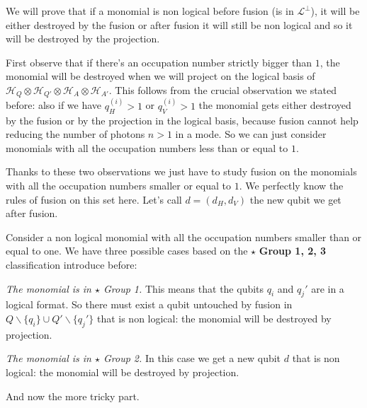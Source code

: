 \documentclass{article}
\begin{document}
We will prove that if a monomial is non logical before fusion (is in $\mathcal{L}^{\perp}$), it will be either destroyed by the fusion or after fusion it will still be non logical and so it will be destroyed by the projection.

First observe that if there's an occupation number strictly bigger than $1$, the monomial will be destroyed when we will project on the logical basis of $\mathcal{H}_{Q} \otimes\mathcal{H}_{Q'} \otimes\mathcal{H}_A \otimes\mathcal{H}_{A'}$. This follows from the crucial observation we stated before: also if we have $q^{(i)}_H > 1$  or $q^{(i)}_V > 1$ the monomial gets either destroyed by the fusion or by the projection in the logical basis, because fusion cannot help reducing the number of photons $n>1$ in a mode. So we can just consider monomials with all the occupation numbers less than or equal to $1$.



Thanks to these two observations we just have to study fusion on the monomials with all the occupation numbers smaller or equal to $1$. We perfectly know the rules of fusion on this set here. Let's call $d=(d_H, d_V)$ the new qubit we get after fusion.

Consider a non logical monomial with all the occupation numbers smaller than or equal to one. We have three possible cases based on the $\star$ \textbf{Group 1, 2, 3} classification introduce before:

\textit{The monomial is in $\star$ Group 1.} This means that the qubits $q_i$ and $q_j'$ are in a logical format. So there must exist a qubit untouched by fusion in $Q \backslash \{q_i\} \cup Q' \backslash \{q_j'\}$ that is non logical: the monomial will be destroyed by projection.

\textit{The monomial is in $\star$ Group 2.} In this case we get a new qubit $d$ that is non logical: the monomial will be destroyed by projection.

And now the more tricky part.
\end{document}
